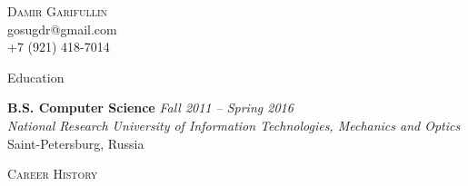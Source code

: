 \documentclass[12pt]{article}
\newenvironment{changemargin}[2]{%
  \begin{list}{}{%
    \setlength{\topsep}{0pt}%
    \setlength{\leftmargin}{#1}%
    \setlength{\rightmargin}{#2}%
    \setlength{\listparindent}{\parindent}%
    \setlength{\itemindent}{\parindent}%
    \setlength{\parsep}{\parskip}%
  }%
  \item[]}{\end{list}
}
\newcommand{\lineover}{
	\begin{changemargin}{-0.05in}{-0.05in}
		\vspace*{-8pt}
		\hrulefill \\
		\vspace*{-2pt}
	\end{changemargin}
}
\newcommand{\header}[1]{
	\begin{changemargin}{-0.5in}{-0.5in}
		\scshape{#1}\\
  	\lineover
	\end{changemargin}
}
\newcommand{\contact}[4]{
	\begin{changemargin}{-0.5in}{-0.5in}
		\begin{center}
			{\Large \scshape {#1}}\\ \smallskip
			{#2}\\ \smallskip 
			{#3}\\ \smallskip
			{#4}\smallskip
		\end{center}
	\end{changemargin}
}
\newenvironment{body} {
	\vspace*{-16pt}
	\begin{changemargin}{-0.25in}{-0.5in}
  }	
	{\end{changemargin}
}
\begin{document}
\contact{Damir Garifullin}{gosugdr@gmail.com}{+7 (921) 418-7014}

\header{Education}

\begin{body}
	\vspace{14pt}
	\textbf{B.S. Computer Science} \hfill \emph{Fall 2011 -- Spring 2016} \\
	\smallskip
	\emph{National Research University of Information Technologies, Mechanics and Optics} Saint-Petersburg, Russia\\
\end{body}

\smallskip


\header{Career History}
\end{document}
